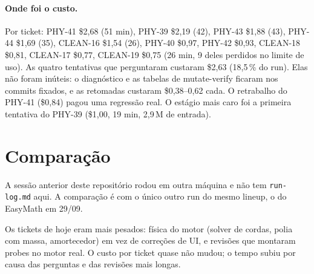 \documentclass[11pt,a4paper]{article}
\begin{document}
\paragraph{Onde foi o custo.} Por ticket: PHY-41 \$2,68 (51 min), PHY-39
\$2,19 (42), PHY-43 \$1,88 (43), PHY-44 \$1,69 (35), CLEAN-16 \$1,54 (26),
PHY-40 \$0,97, PHY-42 \$0,93, CLEAN-18 \$0,81, CLEAN-17 \$0,77, CLEAN-19
\$0,75 (26 min, 9 deles perdidos no limite de uso). As quatro tentativas que
perguntaram custaram \$2,63 (18,5\,\% do run). Elas não foram inúteis: o
diagnóstico e as tabelas de mutate-verify ficaram nos commits fixados, e as
retomadas custaram \$0,38--0,62 cada. O retrabalho do PHY-41 (\$0,84) pagou
uma regressão real. O estágio mais caro foi a primeira tentativa do PHY-39
(\$1,00, 19 min, 2,9\,M de entrada).

\section{Comparação}

A sessão anterior deste repositório rodou em outra máquina e não tem
\texttt{run-log.md} aqui. A comparação é com o único outro run do mesmo
lineup, o do EasyMath em 29/09.

\medskip
{}

\medskip
Os tickets de hoje eram mais pesados: física do motor (solver de cordas,
polia com massa, amortecedor) em vez de correções de UI, e revisões que
montaram probes no motor real. O custo por ticket quase não mudou; o tempo
subiu por causa das perguntas e das revisões mais longas.
\end{document}
